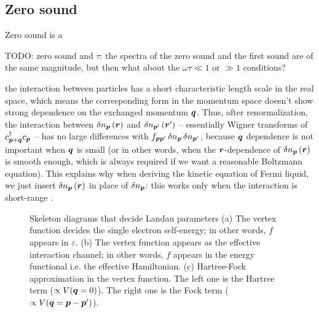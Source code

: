 \documentclass[hyperref, a4paper]{article}
\begin{document}
\subsection{Zero sound}

Zero sound is a 

TODO: zero sound and $\tau$: 
the spectra of the zero sound and the first sound 
are of the same magnitude, 
but then what about the $\omega \tau \ll 1$ or $\gg 1$ conditions?

the interaction between particles has 
a short characteristic length scale in the real space,
which means the corresponding form in the momentum space 
doesn't show strong dependence on the exchanged momentum $\vb*{q}$.
Thus, after renormalization, the interaction between $\var{n}_{\vb*{p}}(\vb*{r})$
and $\var{n}_{\vb*{p}'} (\vb*{r}')$
-- essentially Wigner transforms of $c^\dagger_{\vb*{p} + \vb*{q}} c_{\vb*{p}}$ --
has no large differences with 
$f_{\vb*{p} \vb*{p}'} \var{n}_{\vb*{p}} \var{n}_{\vb*{p}'}$,
because $\vb*{q}$ dependence is not important when $\vb*{q}$ is small 
(or in other words, when the $\vb*{r}$-dependence of $\var{n_{\vb*{p}}}(\vb*{r})$
is smooth enough, which is always required if we want a reasonable Boltzmann equation).
This explains why when deriving the kinetic equation of Fermi liquid, 
we just insert $\var{n}_{\vb*{p}}(\vb*{r})$ in place of $\var{n}_{\vb*{p}}$:
this works only when the interaction is short-range
\cite{pines2018theory}.

\begin{figure}
    \centering
    
    \caption{Skeleton diagrams that decide Landau parameters 
    (a) The vertex function decides the single electron self-energy; 
    in other words, $f$ appears in $\varepsilon$.
    (b) The vertex function appears as the effective interaction channel; 
    in other words, $f$ appears in the energy functional i.e. the effective Hamiltonian.
    (c) Hartree-Fock approximation in the vertex function.
    The left one is the Hartree term ($\propto V(\vb*{q} = 0)$).
    The right one is the Fock term ($\propto V(\vb*{q} = \vb*{p} - \vb*{p}')$).}
    \label{fig:hf-vertex}
\end{figure}
\end{document}
